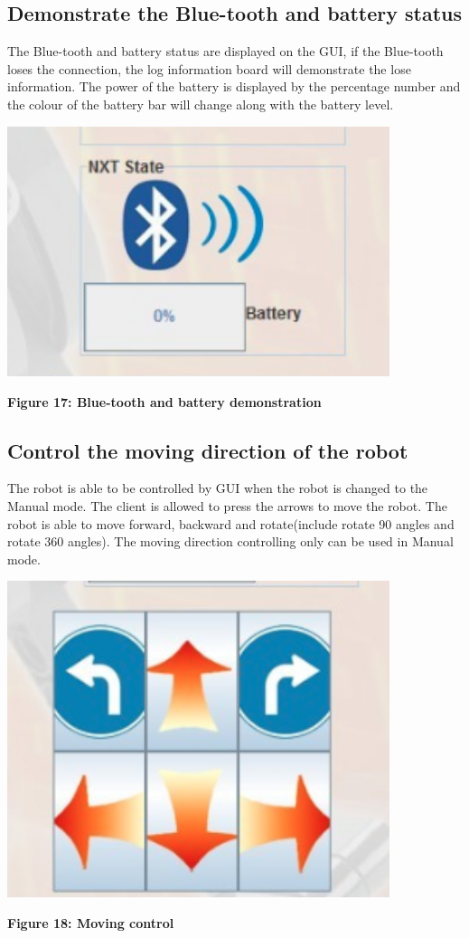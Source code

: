 \documentclass[11pt, a4paper]{report}
\begin{document}
\subsection{Demonstrate the Blue-tooth and battery status}
The Blue-tooth and battery status are displayed on the GUI, if the Blue-tooth loses the connection, the log information board will demonstrate the lose information. The power of the battery is displayed by the percentage number and the colour of the battery bar will change along with the battery level.
 \begin{center}
 \includegraphics[width=11.20cm]{bluetooth_battery}
\end{center}
\begin{center}
\textbf {Figure 17: Blue-tooth and battery demonstration } \\[0.3cm]
\end{center}
\subsection{Control the moving direction of the robot}
The robot is able to be controlled by GUI when the robot is changed to the Manual mode. The client is allowed to press the arrows to move the robot. The robot is able to move forward, backward and rotate(include rotate 90 angles and rotate 360 angles). The moving direction controlling only can be used in Manual mode.
 \begin{center}
 \includegraphics[width=11.20cm]{direction}
\end{center}
\begin{center}
\textbf {Figure 18: Moving control} \\[0.3cm]
\end{center}
\end{document}
